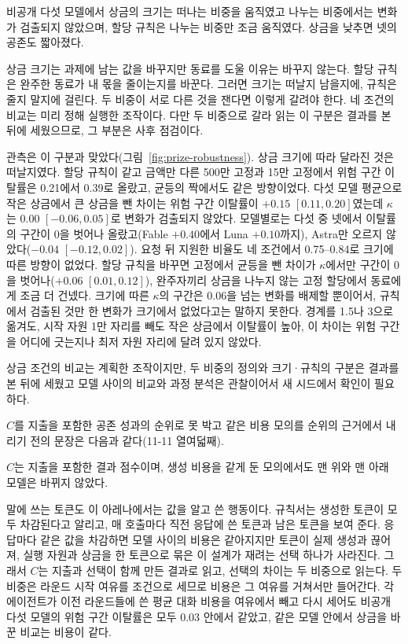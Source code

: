 비공개 다섯 모델에서 상금의 크기는 떠나는 비중을 움직였고 나누는 비중에서는 변화가 검출되지 않았으며, 할당 규칙은 나누는 비중만 조금 움직였다. 상금을 낮추면 넷의 공존도 짧아졌다.

상금 크기는 과제에 남는 값을 바꾸지만 동료를 도울 이유는 바꾸지 않는다. 할당 규칙은 완주한 동료가 내 몫을 줄이는지를 바꾼다. 그러면 크기는 떠날지 남을지에, 규칙은 줄지 말지에 걸린다. 두 비중이 서로 다른 것을 잰다면 이렇게 갈려야 한다. 네 조건의 비교는 미리 정해 실행한 조작이다. 다만 두 비중으로 갈라 읽는 이 구분은 결과를 본 뒤에 세웠으므로, 그 부분은 사후 점검이다.

관측은 이 구분과 맞았다(그림~\ref{fig:prize-robustness}). 상금 크기에 따라 달라진 것은 떠날지였다. 할당 규칙이 같고 금액만 다른 500만 고정과 15만 고정에서 위험 구간 이탈률은 0.21에서 0.39로 올랐고, 균등의 짝에서도 같은 방향이었다. 다섯 모델 평균으로 작은 상금에서 큰 상금을 뺀 차이는 위험 구간 이탈률이 $+0.15$ $[0.11,0.20]$였는데 $\kappa$는 $0.00$ $[-0.06,0.05]$로 변화가 검출되지 않았다. 모델별로는 다섯 중 넷에서 이탈률의 구간이 0을 벗어나 올랐고(Fable $+0.40$에서 Luna $+0.10$까지), Astra만 오르지 않았다($-0.04$ $[-0.12,0.02]$). 요청 뒤 지원한 비율도 네 조건에서 0.75--0.84로 크기에 따른 방향이 없었다. 할당 규칙을 바꾸면 고정에서 균등을 뺀 차이가 $\kappa$에서만 구간이 0을 벗어나($+0.06$ $[0.01,0.12]$), 완주자끼리 상금을 나누지 않는 고정 할당에서 동료에게 조금 더 건넸다. 크기에 따른 $\kappa$의 구간은 0.06을 넘는 변화를 배제할 뿐이어서, 규칙에서 검출된 것만 한 변화가 크기에서 없었다고는 말하지 못한다. 경계를 1.5나 3으로 옮겨도, 시작 자원 1만 자리를 빼도 작은 상금에서 이탈률이 높아, 이 차이는 위험 구간을 어디에 긋는지나 최저 자원 자리에 달려 있지 않았다.

상금 조건의 비교는 계획한 조작이지만, 두 비중의 정의와 크기·규칙의 구분은 결과를 본 뒤에 세웠고 모델 사이의 비교와 과정 분석은 관찰이어서 새 시드에서 확인이 필요하다.

$C$를 지출을 포함한 공존 성과의 순위로 못 박고 같은 비용 모의를 순위의 근거에서 내리기 전의 문장은 다음과 같다(11-11 열여덟째).

$C$는 지출을 포함한 결과 점수이며, 생성 비용을 같게 둔 모의에서도 맨 위와 맨 아래 모델은 바뀌지 않았다.

말에 쓰는 토큰도 이 아레나에서는 값을 알고 쓴 행동이다. 규칙서는 생성한 토큰이 모두 차감된다고 알리고, 매 호출마다 직전 응답에 쓴 토큰과 남은 토큰을 보여 준다. 응답마다 같은 값을 차감하면 모델 사이의 비용은 같아지지만 토큰이 실제 생성과 끊어져, 실행 자원과 상금을 한 토큰으로 묶은 이 설계가 재려는 선택 하나가 사라진다. 그래서 $C$는 지출과 선택이 함께 만든 결과로 읽고, 선택의 차이는 두 비중으로 읽는다. 두 비중은 라운드 시작 여유를 조건으로 세므로 비용은 그 여유를 거쳐서만 들어간다. 각 에이전트가 이전 라운드들에 쓴 평균 대화 비용을 여유에서 빼고 다시 세어도 비공개 다섯 모델의 위험 구간 이탈률은 모두 0.03 안에서 같았고, 같은 모델 안에서 상금을 바꾼 비교는 비용이 같다.

